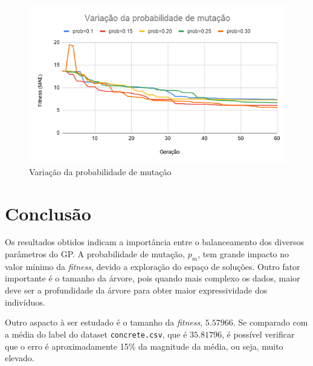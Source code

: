 \documentclass[a4paper]{article}
\begin{document}
\begin{figure}[h!]
  \begin{minipage}{0.5\textwidth}
    \includegraphics[width=\textwidth]{var_pm}
    \caption{Variação da probabilidade de mutação}
    \label{fig:var_pm}
  \end{minipage}
\end{figure}
\newpage
\section{Conclusão}
Os resultados obtidos indicam a importância entre o balanceamento dos diversos
parâmetros do GP. A probabilidade de mutação, $p_m$, tem grande impacto no valor
mínimo da \textit{fitness}, devido a exploração do espaço de soluções. Outro
fator importante é o tamanho da árvore, pois quando mais complexo os dados,
maior deve ser a profundidade da árvore para obter maior expressividade dos
indivíduos.

Outro aspacto à ser estudado é o tamanho da \textit{fitness}, $5.57966$. Se
comparado com a média do label do dataset \texttt{concrete.csv}, que é
$35.81796$, é possível verificar que o erro é aproximadamente 15\% da magnitude
da média, ou seja, muito elevado. 

\newpage


\end{document}
